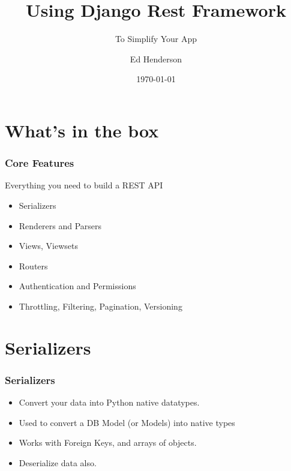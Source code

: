 \documentclass{beamer}
\title{Using Django Rest Framework}
\subtitle{To Simplify Your App}
\author{Ed Henderson}
\date{\today}
\begin{document}

\frame{\titlepage}

\frame{\tableofcontents}

\section{What's in the box}
\begin{frame}

  \frametitle{Core Features}

Everything you need to build a REST API

  \begin{itemize}
  \item Serializers
  \item Renderers and Parsers
  \item Views, Viewsets
  \item Routers
  \item Authentication and Permissions
  \item Throttling, Filtering, Pagination, Versioning
  \end{itemize}
\end{frame}

\section{Serializers}
\begin{frame}[fragile]

  \frametitle{Serializers}

  \begin{itemize}
  \item Convert your data into Python native datatypes.
  \item Used to convert a DB Model (or Models) into native types
  \item Works with Foreign Keys, and arrays of objects. 
  \item Deserialize data also.
  \end{itemize}
  
\end{frame}
\end{document}
